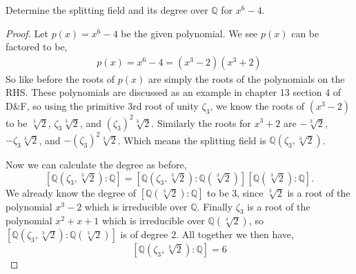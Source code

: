\documentclass[11pt]{article}
\newenvironment{problem}[2][Problem\!]{\begin{trivlist}
\item[\hskip \labelsep {\bfseries #1}\hskip \labelsep {\bfseries #2}]}{\end{trivlist}}
\newcommand{\qq}{\mathbb Q}   %
\newcommand{\lrb}[1]{\left[#1\right]}
\begin{document}
\newpage

\begin{problem}{13.4.4}
    Determine the splitting field and its degree over $\qq$ for $x^{6} -4$.
\end{problem}
\begin{example}
    \begin{proof}
        Let $p(x) = x^{6} -4$ be the given polynomial. We see $p(x)$ can be factored to be,
        \begin{align*}
            p(x) = x^{6} - 4 = (x^{3} - 2)(x^{3} + 2)
        \end{align*}
        So like before the roots of $p(x)$ are simply the roots of the polynomials on the RHS. These polynomials are discussed as an example in chapter 13 section 4 of D\&F, so using the primitive 3rd root of unity $\zeta_3$, we know the roots of $(x^{3} - 2)$ to be  $\sqrt[3]{2}$, $\zeta_3 \sqrt[3]{2}$, and $(\zeta_3)^{2}\sqrt[3]{2}$. Similarly the roots for $x^{3} + 2$ are $-\sqrt[3]{2}$, $-\zeta_3\sqrt[3]{2} $, and $-(\zeta_3)^{2}\sqrt[3]{2}$. Which means the splitting field is $\qq(\zeta_3, \sqrt[3]{2})$. 

        Now we can calculate the degree as before,
        \[\lrb{\qq(\zeta_3, \sqrt[3]{2}) : \qq} = \lrb{\qq(\zeta_3, \sqrt[3]{2}): \qq(\sqrt[3]{2})}\lrb{\qq(\sqrt[3]{2}): \qq}.\]
        We already know the degree of $\lrb{\qq(\sqrt[3]{2}): \qq}$ to be 3, since $\sqrt[3]{2}$ is a root of the polynomial $x^{3} - 2$ which is irreducible over $\qq$. Finally $\zeta_3$ is a root of the polynomial $x^{2} + x + 1$ which is irreducible over $\qq(\sqrt[3]{2})$, so $\lrb{\qq(\zeta_3, \sqrt[3]{2}): \qq(\sqrt[3]{2})}$ is of degree 2. All together we then have,
        \[\lrb{\qq(\zeta_3, \sqrt[3]{2}) : \qq} = 6\] 
    \end{proof}
\end{example}
\end{document}
